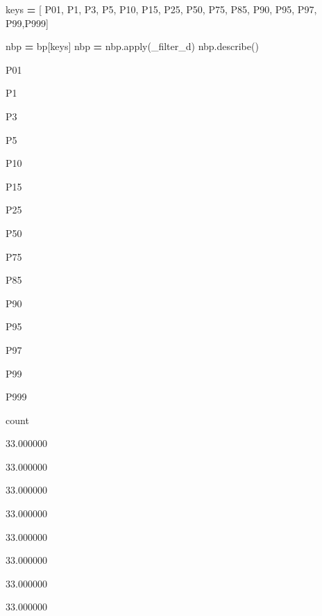 \documentclass[
]{article}
\newenvironment{Shaded}{\begin{snugshade}}{\end{snugshade}}
\newcommand{\BuiltInTok}[1]{#1}
\newcommand{\NormalTok}[1]{#1}
\newcommand{\OperatorTok}[1]{\textcolor[rgb]{0.81,0.36,0.00}{\textbf{#1}}}
\newcommand{\StringTok}[1]{\textcolor[rgb]{0.31,0.60,0.02}{#1}}
\begin{document}
\begin{Shaded}
\begin{Highlighting}[]
\NormalTok{keys }\OperatorTok{=}\NormalTok{ [ }\StringTok{\textquotesingle{}P01\textquotesingle{}}\NormalTok{, }\StringTok{\textquotesingle{}P1\textquotesingle{}}\NormalTok{, }\StringTok{\textquotesingle{}P3\textquotesingle{}}\NormalTok{, }\StringTok{\textquotesingle{}P5\textquotesingle{}}\NormalTok{, }\StringTok{\textquotesingle{}P10\textquotesingle{}}\NormalTok{, }\StringTok{\textquotesingle{}P15\textquotesingle{}}\NormalTok{, }\StringTok{\textquotesingle{}P25\textquotesingle{}}\NormalTok{, }\StringTok{\textquotesingle{}P50\textquotesingle{}}\NormalTok{, }\StringTok{\textquotesingle{}P75\textquotesingle{}}\NormalTok{, }\StringTok{\textquotesingle{}P85\textquotesingle{}}\NormalTok{, }\StringTok{\textquotesingle{}P90\textquotesingle{}}\NormalTok{, }\StringTok{\textquotesingle{}P95\textquotesingle{}}\NormalTok{, }\StringTok{\textquotesingle{}P97\textquotesingle{}}\NormalTok{, }\StringTok{\textquotesingle{}P99\textquotesingle{}}\NormalTok{,}\StringTok{\textquotesingle{}P999\textquotesingle{}}\NormalTok{]}

\NormalTok{nbp }\OperatorTok{=}\NormalTok{ bp[keys]}
\NormalTok{nbp }\OperatorTok{=}\NormalTok{ nbp.}\BuiltInTok{apply}\NormalTok{(\_filter\_d)}
\NormalTok{nbp.describe()}
\end{Highlighting}
\end{Shaded}

P01

P1

P3

P5

P10

P15

P25

P50

P75

P85

P90

P95

P97

P99

P999

count

33.000000

33.000000

33.000000

33.000000

33.000000

33.000000

33.000000

33.000000
\end{document}
